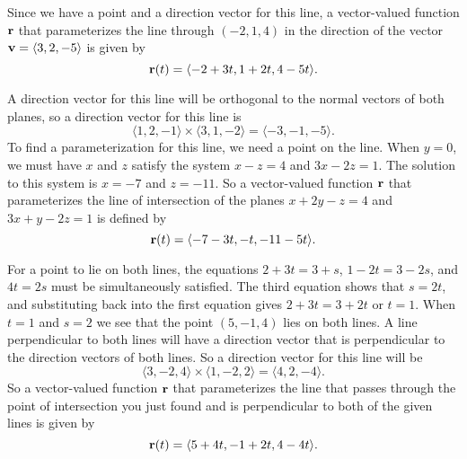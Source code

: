 \begin{exercises}
\begin{exerciseSolution}
\ba
	\item Since we have a point and a direction vector for this line, a vector-valued function $\mathbf{r}$ that parameterizes the line through $(-2,1,4)$ in the direction of the vector $\mathbf{v} = \langle 3, 2, -5 \rangle$ is given by 
	\[\mathbf{r}(t) = \langle -2+3t, 1+2t, 4-5t \rangle.\]
	\item A direction vector for this line will be orthogonal to the normal vectors of both planes, so a direction vector for this line is 
\[\langle 1, 2, -1 \rangle \times \langle 3,1,-2 \rangle = \langle -3,-1,-5 \rangle.\]
To find a parameterization for this line, we need a point on the line. When $y=0$, we must have $x$ and $z$ satisfy the system $x-z=4$ and $3x-2z=1$. The solution to this system is $x=-7$ and $z=-11$. So a vector-valued function $\mathbf{r}$ that parameterizes the line of intersection of the planes $x + 2y - z = 4$ and $3x + y - 2z = 1$ is defined by
\[\mathbf{r}(t) = \langle -7-3t, -t, -11-5t \rangle.\]
	\item For a point to lie on both lines, the equations $2+3t=3+s$, $1-2t=3-2s$, and $4t=2s$ must be simultaneously satisfied. The third equation shows that $s=2t$, and substituting back into the first equation gives $2+3t=3+2t$ or $t=1$. When $t=1$ and $s=2$ we see that the point $(5,-1,4)$ lies on both lines. A line perpendicular to both lines will have a direction vector that is perpendicular to the direction vectors of both lines. So a direction vector for this line will be 
\[\langle 3,-2,4 \rangle \times \langle 1, -2,2 \rangle = \langle 4, 2, -4 \rangle.\]
So a vector-valued function $\mathbf{r}$ that parameterizes the line that passes through the point of intersection you just found and is perpendicular to both of the given lines is given by 
\[\mathbf{r}(t) = \langle 5+4t, -1+2t, 4-4t \rangle.\]
\ea
\end{exerciseSolution}



\end{exercises}
\afterexercises

